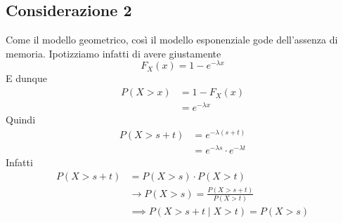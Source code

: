 \documentclass[11pt]{report}
\begin{document}
\subsection{Considerazione 2}
Come il modello geometrico, così il modello esponenziale gode dell'assenza di memoria. Ipotizziamo infatti di avere giustamente
\begin{equation}
    F_X(x) = 1 - e^{-\lambda x}
\end{equation}
E dunque
\begin{equation}
    \begin{split}
        P(X > x) & = 1 - F_X(x)\\
        & = e^{-\lambda x}
    \end{split}
\end{equation}
Quindi
\begin{equation}
    \begin{split}
        P(X > s+t) & = e^{-\lambda (s+t)}\\
        & = e^{-\lambda s} \cdot e^{-\lambda t}
    \end{split}
\end{equation}
Infatti
\begin{equation}
    \begin{split}
        P(X > s+t) & = P(X > s) \cdot P(X > t)\\
        & \rightarrow P(X > s) = \frac{P(X > s+t)}{P(X > t)}\\
        & \implies P(X > s+t \mid X > t) = P(X > s)
    \end{split}
\end{equation}
\end{document}
